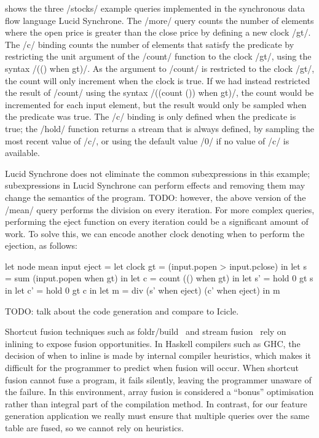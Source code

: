  shows the three \Lucy/stocks/ example queries implemented in the synchronous data flow language Lucid Synchrone.
The \Lucy/more/ query counts the number of elements where the open price is greater than the close price by defining a new clock \Lucy/gt/.
The \Lucy/c/ binding counts the number of elements that satisfy the predicate by restricting the unit argument of the \Lucy/count/ function to the clock \Lucy/gt/, using the syntax \Lucy/(() when gt)/.
As the argument to \Lucy/count/ is restricted to the clock \Lucy/gt/, the count will only increment when the clock is true.
If we had instead restricted the result of \Lucy/count/ using the syntax \Lucy/((count ()) when gt)/, the count would be incremented for each input element, but the result would only be sampled when the predicate was true.
The \Lucy/c/ binding is only defined when the predicate is true; the \Lucy/hold/ function returns a stream that is always defined, by sampling the most recent value of \Lucy/c/, or using the default value \Lucy/0/ if no value of \Lucy/c/ is available.

Lucid Synchrone does not eliminate the common subexpressions in this example; subexpressions in Lucid Synchrone can perform effects and removing them may change the semantics of the program.
TODO: however, the above version of the \Lucy/mean/ query performs the division on every iteration. For more complex queries, performing the eject function on every iteration could be a significant amount of work.
To solve this, we can encode another clock denoting when to perform the ejection, as follows:

\begin{lucy}
let node mean input eject =
 let clock gt = (input.popen > input.pclose)
 in let s = sum (input.popen when gt)
 in let c = count (() when gt)
 in let s' = hold 0 gt s
 in let c' = hold 0 gt c
 in let m = div (s' when eject) (c' when eject)
 in m
\end{lucy}

TODO: talk about the code generation and compare to Icicle.


Shortcut fusion techniques such as foldr/build~\cite{gill1993short} and stream fusion~\cite{coutts2007stream} rely on inlining to expose fusion opportunities.
In Haskell compilers such as GHC, the decision of when to inline is made by internal compiler heuristics, which makes it difficult for the programmer to predict when fusion will occur.
When shortcut fusion cannot fuse a program, it fails silently, leaving the programmer unaware of the failure.
In this environment, array fusion is considered a ``bonus'' optimisation rather than integral part of the compilation method.
In contrast, for our feature generation application we really must ensure that multiple queries over the same table are fused, so we cannot rely on heuristics.

